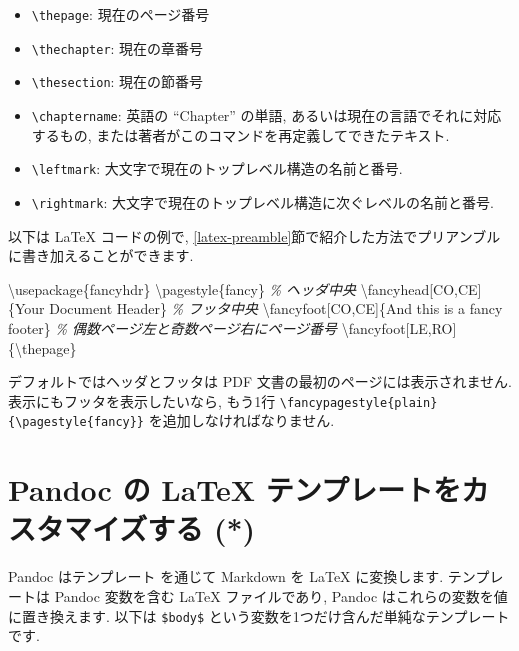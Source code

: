 \documentclass[
  11pt,
  lualatex,
  ja=standard]{bxjsreport}
\newenvironment{Shaded}{\begin{snugshade}}{\end{snugshade}}
\newcommand{\BuiltInTok}[1]{#1}
\newcommand{\CommentTok}[1]{\textcolor[rgb]{0.56,0.35,0.01}{\textit{#1}}}
\newcommand{\ExtensionTok}[1]{#1}
\newcommand{\FunctionTok}[1]{\textcolor[rgb]{0.00,0.00,0.00}{#1}}
\newcommand{\NormalTok}[1]{#1}
\providecommand{\tightlist}{%
  \setlength{\itemsep}{0pt}\setlength{\parskip}{0pt}}
\begin{document}
\begin{itemize}
\tightlist
\item
  \texttt{\textbackslash{}thepage}: 現在のページ番号
\item
  \texttt{\textbackslash{}thechapter}: 現在の章番号
\item
  \texttt{\textbackslash{}thesection}: 現在の節番号
\item
  \texttt{\textbackslash{}chaptername}: 英語の ``Chapter'' の単語, あるいは現在の言語でそれに対応するもの, または著者がこのコマンドを再定義してできたテキスト.
\item
  \texttt{\textbackslash{}leftmark}: 大文字で現在のトップレベル構造の名前と番号.
\item
  \texttt{\textbackslash{}rightmark}: 大文字で現在のトップレベル構造に次ぐレベルの名前と番号.
\end{itemize}

以下は LaTeX コードの例で, \ref{latex-preamble}節で紹介した方法でプリアンブルに書き加えることができます.

\begin{Shaded}
\begin{Highlighting}[]
\BuiltInTok{\textbackslash{}usepackage}\NormalTok{\{}\ExtensionTok{fancyhdr}\NormalTok{\}}
\FunctionTok{\textbackslash{}pagestyle}\NormalTok{\{fancy\}}
\CommentTok{\% ヘッダ中央}
\FunctionTok{\textbackslash{}fancyhead}\NormalTok{[CO,CE]\{Your Document Header\}}
\CommentTok{\% フッタ中央}
\FunctionTok{\textbackslash{}fancyfoot}\NormalTok{[CO,CE]\{And this is a fancy footer\}}
\CommentTok{\% 偶数ページ左と奇数ページ右にページ番号}
\FunctionTok{\textbackslash{}fancyfoot}\NormalTok{[LE,RO]\{}\FunctionTok{\textbackslash{}thepage}\NormalTok{\}}
\end{Highlighting}
\end{Shaded}

デフォルトではヘッダとフッタは PDF 文書の最初のページには表示されません. 表示にもフッタを表示したいなら, もう1行 \texttt{\textbackslash{}fancypagestyle\{plain\}\{\textbackslash{}pagestyle\{fancy\}\}} を追加しなければなりません.

\hypertarget{latex-template}{%
\section{Pandoc の LaTeX テンプレートをカスタマイズする (*)}\label{latex-template}}

Pandoc はテンプレート を通じて Markdown を LaTeX に変換します. テンプレートは Pandoc 変数を含む LaTeX ファイルであり, Pandoc はこれらの変数を値に置き換えます. 以下は \texttt{\$body\$} という変数を1つだけ含んだ単純なテンプレートです.
\end{document}
